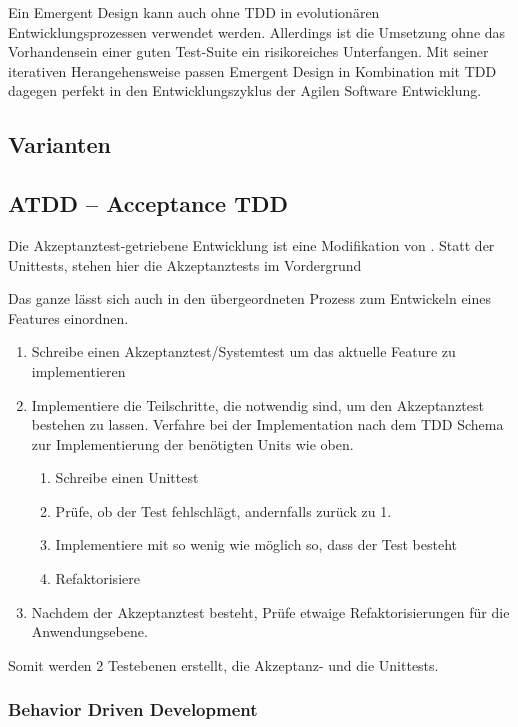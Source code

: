 Ein Emergent Design kann auch ohne TDD in evolutionären Entwicklungsprozessen verwendet werden. Allerdings ist die Umsetzung ohne das Vorhandensein einer guten Test-Suite ein risikoreiches Unterfangen.
Mit seiner iterativen Herangehensweise passen Emergent Design in Kombination mit TDD dagegen perfekt in den Entwicklungszyklus der Agilen Software Entwicklung.


\subsection{Varianten}
  \subsection{ATDD -- Acceptance TDD}
  \label{sec:attd}
  Die Akzeptanztest-getriebene Entwicklung ist eine Modifikation von . Statt der Unittests, stehen hier die Akzeptanztests im Vordergrund
  
  Das ganze lässt sich auch in den übergeordneten Prozess zum Entwickeln eines Features einordnen.
  \begin{enumerate}
   \item Schreibe einen Akzeptanztest/Systemtest um das aktuelle Feature zu implementieren
   \item Implementiere die Teilschritte, die notwendig sind, um den Akzeptanztest bestehen zu lassen. Verfahre bei der Implementation nach dem TDD Schema zur Implementierung der benötigten Units wie oben.
    \begin{enumerate}
     \item Schreibe einen Unittest
     \item Prüfe, ob der Test fehlschlägt, andernfalls zurück zu 1.
     \item Implementiere mit so wenig wie möglich so, dass der Test besteht
     \item Refaktorisiere
    \end{enumerate}
   \item Nachdem der Akzeptanztest besteht, Prüfe etwaige Refaktorisierungen für die Anwendungsebene.   
  \end{enumerate}
  
  Somit werden 2 Testebenen erstellt, die Akzeptanz- und die Unittests.


  \subsubsection{Behavior Driven Development}
  
